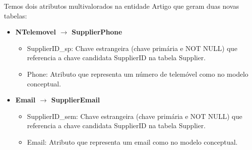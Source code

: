 \documentclass[a4paper,12pt]{scrreprt}
\begin{document}
\begin{itemize}
\begin{itemize}
            \end{itemize}
             Temos dois atributos multivalorados na entidade Artigo que geram duas novas tabelas:
             \begin{itemize}
                \item{\textbf{NTelemovel $\rightarrow$ SupplierPhone}}
                    \begin{itemize}
                        \item{SupplierID\_sp:} Chave estrangeira (chave primária e NOT NULL) que referencia a chave candidata SupplierID
                        na tabela Supplier.
                        \item{Phone:} Atributo que representa um número de telemóvel como no modelo conceptual.
                    \end{itemize}
                \item{\textbf{Email $\rightarrow$ SupplierEmail}}
                    \begin{itemize}
                        \item{SupplierID\_sem:} Chave estrangeira (chave primária e NOT NULL) que referencia a chave candidata SupplierID na tabela Supplier.
                        \item{Email:} Atributo que representa um email como no modelo conceptual.
                    \end{itemize}
            \end{itemize}
    \end{itemize}
\end{document}
